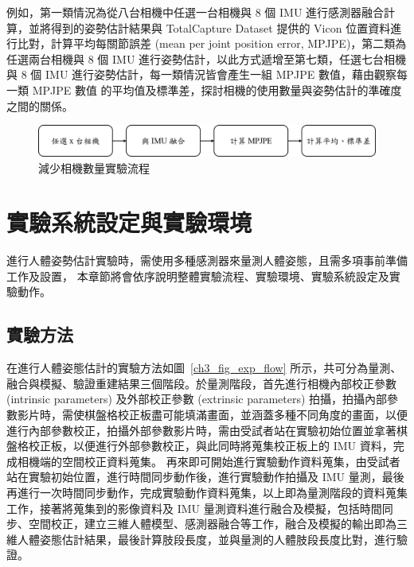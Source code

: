 例如，第一類情況為從八台相機中任選一台相機與 8 個 IMU 進行感測器融合計算，並將得到的姿勢估計結果與 TotalCapture Dataset 提供的 Vicon 位置資料進行比對，計算平均每關節誤差 (mean per joint position error, MPJPE)，第二類為任選兩台相機與 8 個 IMU 進行姿勢估計，以此方式遞增至第七類，任選七台相機與 8 個 IMU 進行姿勢估計，每一類情況皆會產生一組 MPJPE 數值，藉由觀察每一類 MPJPE 數值 的平均值及標準差，探討相機的使用數量與姿勢估計的準確度之間的關係。

\begin{figure}[!ht]
   \centering
   \includegraphics[width=\linewidth]{figure/ch3_fig_cameraset_flow.png}
    \caption[減少相機數量實驗流程]{減少相機數量實驗流程}
    \label{ch3_fig_cameraset_flow}
\end{figure}

\section{實驗系統設定與實驗環境}\label{ch3_exp_setting}
進行人體姿勢估計實驗時，需使用多種感測器來量測人體姿態，且需多項事前準備工作及設置，
本章節將會依序說明整體實驗流程、實驗環境、實驗系統設定及實驗動作。

\subsection{實驗方法}
在進行人體姿態估計的實驗方法如圖~\ref{ch3_fig_exp_flow} 所示，共可分為量測、融合與模擬、驗證重建結果三個階段。於量測階段，首先進行相機內部校正參數 (intrinsic parameters) 及外部校正參數 (extrinsic parameters) 拍攝，拍攝內部參數影片時，需使棋盤格校正板盡可能填滿畫面，並涵蓋多種不同角度的畫面，以便進行內部參數校正，拍攝外部參數影片時，需由受試者站在實驗初始位置並拿著棋盤格校正板，以便進行外部參數校正，與此同時將蒐集校正板上的 IMU 資料，完成相機端的空間校正資料蒐集。
再來即可開始進行實驗動作資料蒐集，由受試者站在實驗初始位置，進行時間同步動作後，進行實驗動作拍攝及 IMU 量測，最後再進行一次時間同步動作，完成實驗動作資料蒐集，以上即為量測階段的資料蒐集工作，接著將蒐集到的影像資料及 IMU 量測資料進行融合及模擬，包括時間同步、空間校正，建立三維人體模型、感測器融合等工作，融合及模擬的輸出即為三維人體姿態估計結果，最後計算肢段長度，並與量測的人體肢段長度比對，進行驗證。

